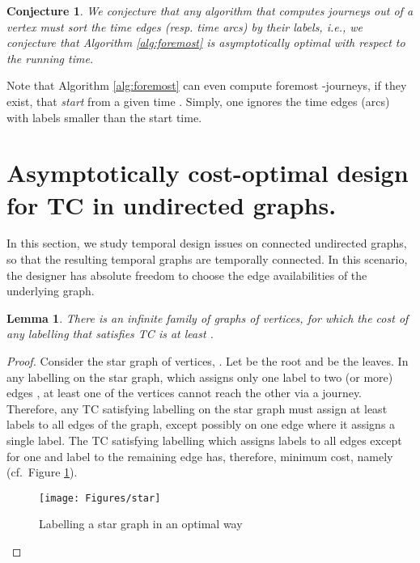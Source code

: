 \documentclass[a4paper,UKenglish]{article}
\newtheorem{lemma}{Lemma}
\newtheorem*{conjecture*}{Conjecture}
\begin{document}
\begin{conjecture*}
We conjecture that any algorithm that computes journeys out of a vertex  must sort the time edges (resp. time arcs) by their labels, i.e., we conjecture that Algorithm \ref{alg:foremost} is asymptotically optimal with respect to the running time.
\end{conjecture*}

Note that Algorithm \ref{alg:foremost} can even compute foremost -journeys, if they exist, that \emph{start} from a given time . Simply, one ignores the time edges (arcs) with labels smaller than the start time.






\section{Asymptotically cost-optimal design for TC in undirected graphs.}\label{sec:cost_opt_design}
In this section, we study temporal design issues on connected undirected graphs, so that the resulting temporal graphs are temporally connected. In this scenario, the designer has absolute freedom to choose the edge availabilities of the underlying graph.

\begin{lemma}\label{thm:star}
There is an infinite family of graphs  of  vertices, for which the cost of any labelling that satisfies TC is at least .
\end{lemma}
\begin{proof}
Consider the star graph of  vertices, . Let  be the root and  be the leaves. In any labelling on the star graph, which assigns only one label to two (or more) edges , at least one of the vertices  cannot reach the other via a journey. Therefore, any TC satisfying labelling on the star graph must assign at least  labels to all edges of the graph, except possibly on one edge where it assigns a single label. The TC satisfying labelling which assigns labels  to all edges except for one and label  to the remaining edge has, therefore, minimum cost, namely  (cf.~Figure \ref{fig:star}). 

\begin{figure}[!htb]
\centering
\texttt{[image: Figures/star]}
\caption{Labelling a star graph in an optimal way}
\label{fig:star}
\end{figure}
\end{proof}
\end{document}
